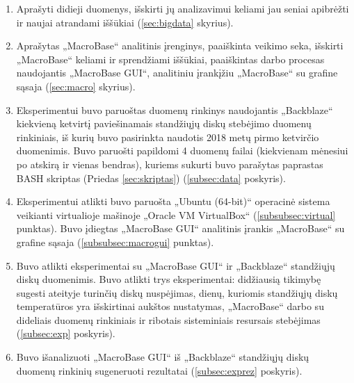 \documentclass{VUMIFPSkursinis}
\begin{document}
\begin{enumerate}
\item Aprašyti didieji duomenys, išskirti jų analizavimui keliami jau seniai apibrėžti ir naujai atrandami iššūkiai (\ref{sec:bigdata} skyrius).

\item Aprašytas „MacroBase“ analitinis įrenginys, paaiškinta veikimo seka, išskirti „MacroBase“ keliami ir sprendžiami iššūkiai, paaiškintas darbo procesas naudojantis „MacroBase GUI“, analitiniu įrankįžiu „MacroBase“ su grafine sąsaja (\ref{sec:macro} skyrius).

\item Eksperimentui buvo paruoštas duomenų rinkinys naudojantis „Backblaze“ kiekvieną ketvirtį paviešinamais standžiųjų diskų stebėjimo duomenų rinkiniais, iš kurių buvo pasirinkta naudotis 2018 metų pirmo ketvirčio duomenimis. Buvo paruošti papildomi 4 duomenų failai (kiekvienam mėnesiui po atskirą ir vienas bendras), kuriems sukurti buvo parašytas paprastas BASH skriptas (Priedas \ref{sec:skriptas}) (\ref{subsec:data} poskyris).

\item Eksperimentui atlikti buvo paruošta „Ubuntu (64-bit)“ operacinė sistema veikianti virtualioje mašinoje „Oracle VM VirtualBox“ (\ref{subsubsec:virtual} punktas). Buvo įdiegtas „MacroBase GUI“ analitinis įrankis „MacroBase“ su grafine sąsaja (\ref{subsubsec:macrogui} punktas).

\item Buvo atlikti eksperimentai su „MacroBase GUI“ ir „Backblaze“ standžiųjų diskų duomenimis. Buvo atlikti trys eksperimentai: didžiausią tikimybę sugesti ateityje turinčių diskų nuspėjimas, dienų, kuriomis standžiųjų diskų temperatūros yra išskirtinai aukštos nustatymas, „MacroBase“ darbo su dideliais duomenų rinkiniais ir ribotais sisteminiais resursais stebėjimas (\ref{subsec:exp} poskyris).

\item Buvo išanalizuoti „MacroBase GUI“ iš „Backblaze“ standžiųjų diskų duomenų rinkinių sugeneruoti rezultatai (\ref{subsec:exprez} poskyris).

\end{enumerate}
\end{document}

